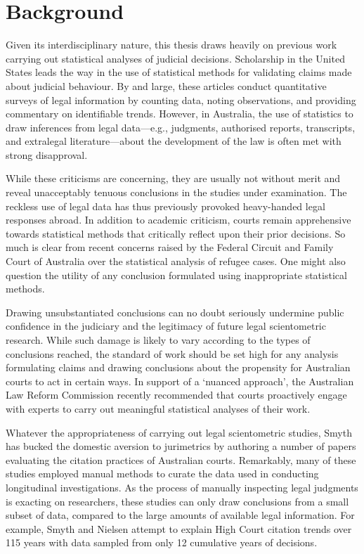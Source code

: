 \let\xn\xnote
\section{Background}


Given its interdisciplinary nature, this thesis draws heavily on previous work carrying out statistical analyses of judicial decisions. Scholarship in the United States leads the way in the use of statistical methods for validating claims made about judicial behaviour.\xn{2-1} By and large, these articles conduct quantitative surveys of legal information by counting data, noting observations, and providing commentary on identifiable trends.\xn{2-2} However, in Australia, the use of statistics to draw inferences from legal data---e.g., judgments, authorised reports, transcripts, and extralegal literature---about the development of the law is often met with strong disapproval.\xn{2-3} 

While these criticisms are concerning, they are usually not without merit and reveal unacceptably tenuous conclusions in the studies under examination.\xn{2-3a} The reckless use of legal data has thus previously provoked heavy-handed legal responses abroad.\xn{2-3b} In addition to academic criticism, courts remain apprehensive towards statistical methods that critically reflect upon their prior decisions.\xn{2-3ba} So much is clear from recent concerns raised by the Federal Circuit and Family Court of Australia over the statistical analysis of refugee cases.\xn{2-3bb} One might also question the utility of any conclusion formulated using inappropriate statistical methods.

Drawing unsubstantiated conclusions can no doubt seriously undermine public confidence in the judiciary and the legitimacy of future legal scientometric research.\xn{2-3bc} While such damage is likely to vary according to the types of conclusions reached, the standard of work should be set high for any analysis formulating claims and drawing conclusions about the propensity for Australian courts to act in certain ways. In support of a `nuanced approach', the Australian Law Reform Commission recently recommended that courts proactively engage with experts to carry out meaningful statistical analyses of their work.\xn{2-3c}

Whatever the appropriateness of carrying out legal scientometric studies, Smyth has  bucked the domestic aversion to jurimetrics by authoring a number of papers evaluating the citation practices of Australian courts.\xn{2-4} Remarkably, many of these studies employed manual methods to curate the data used in conducting longitudinal investigations.\xn{2-5} As the process of manually inspecting legal judgments is exacting on researchers, these studies can only draw conclusions from a small subset of data, compared to the large amounts of available legal information. For example, Smyth and Nielsen attempt to explain High Court citation trends over 115 years with data sampled from only 12 cumulative years of decisions.\xn{2-5a}

